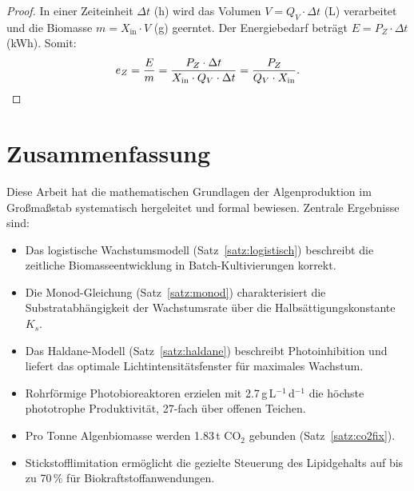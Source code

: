 ﻿\documentclass[a4paper,12pt]{article}
\theoremstyle{definition}
\begin{document}
\begin{proof}
	In einer Zeiteinheit $\Delta t$ (h) wird das Volumen $V = Q_V \cdot \Delta t$ (L)
	verarbeitet und die Biomasse $m = X_\mathrm{in} \cdot V$ (g) geerntet.
	Der Energiebedarf beträgt $E = P_Z \cdot \Delta t$ (kWh).
	Somit:
	\[
		e_Z = \frac{E}{m} = \frac{P_Z \cdot \Delta t}{X_\mathrm{in} \cdot Q_V \cdot \Delta t}
		= \frac{P_Z}{Q_V \cdot X_\mathrm{in}}. \qedhere
	\]
\end{proof}

\section{Zusammenfassung}

Diese Arbeit hat die mathematischen Grundlagen der Algenproduktion im Großmaßstab
systematisch hergeleitet und formal bewiesen. Zentrale Ergebnisse sind:

\begin{itemize}
	\item Das logistische Wachstumsmodell (Satz~\ref{satz:logistisch}) beschreibt
	      die zeitliche Biomasseentwicklung in Batch-Kultivierungen korrekt.
	\item Die Monod-Gleichung (Satz~\ref{satz:monod}) charakterisiert die
	      Substratabhängigkeit der Wachstumsrate über die Halbsättigungskonstante $K_s$.
	\item Das Haldane-Modell (Satz~\ref{satz:haldane}) beschreibt Photoinhibition und
	      liefert das optimale Lichtintensitätsfenster für maximales Wachstum.
	\item Rohrförmige Photobioreaktoren erzielen mit 2.7\,g\,L$^{-1}$\,d$^{-1}$
	      die höchste phototrophe Produktivität, 27-fach über offenen Teichen.
	\item Pro Tonne Algenbiomasse werden 1.83\,t CO$_2$ gebunden
	      (Satz~\ref{satz:co2fix}).
	\item Stickstofflimitation ermöglicht die gezielte Steuerung des
	      Lipidgehalts auf bis zu 70\,\% für Biokraftstoffanwendungen.
\end{itemize}
\end{document}
